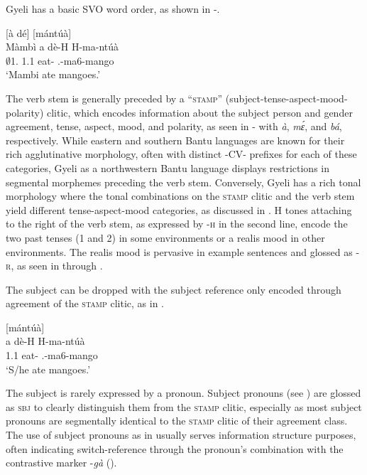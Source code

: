 Gyeli has a basic SVO word order, as shown in -.

\ea \label{i}
 [à dé]{} [mántúà]{}\\
	{\db}Màmbì {\db}a dè-H {\db}H-ma-ntúà \\
         {\db}$\emptyset$1.{\PN} {\db}1.{\PST}1 eat-{\R} {\db}{\OBJ}.{\LINK}-ma6-mango   \\
    \trans `Mambi ate mangoes.'
\z


The verb stem is generally preceded by a ``\textsc{stamp}'' (subject-tense-aspect-mood-polarity) clitic, which encodes information about the subject person and gender agreement, tense, aspect, mood, and polarity, as seen in - with {\itshape à}, {\itshape mɛ́}, and {\itshape bá}, respectively. While eastern and southern Bantu languages are known for their rich agglutinative morphology, often with distinct -CV- prefixes for each of these categories, Gyeli as a northwestern Bantu language displays restrictions in segmental morphemes preceding the verb stem. Conversely, Gyeli has a rich tonal morphology where the tonal combinations on the \textsc{stamp} clitic and the verb stem yield different tense-aspect-mood categories, as discussed in . H tones attaching to the right of the verb stem, as expressed by -\textsc{h} in the second line, encode the two past tenses ({\PST}1 and {\PST}2) in some environments or a realis mood in other environments. The realis mood is pervasive in example sentences and glossed as -\textsc{r}, as seen in  through .

The subject can be dropped with the subject reference only encoded through agreement of the \textsc{stamp} clitic, as in .

\ea \label{ix}
\glll  [à dé] [mántúà]\\
	  {\db}a dè-H {\db}H-ma-ntúà\\
        {\db}1.{\PST}1 eat-{\R} {\db}{\OBJ}.{\LINK}-ma6-mango\\
    \trans `S/he ate mangoes.'
\z



The subject is rarely expressed by a pronoun. Subject pronouns (see ) are glossed as \textsc{sbj} to clearly distinguish them from the \textsc{stamp} clitic, especially as most subject pronouns  are segmentally identical to the \textsc{stamp} clitic of their agreement class.  The use of subject pronouns as in  usually serves information structure purposes, often indicating switch-reference through the pronoun's combination with the contrastive marker -{\itshape gà}  ().

